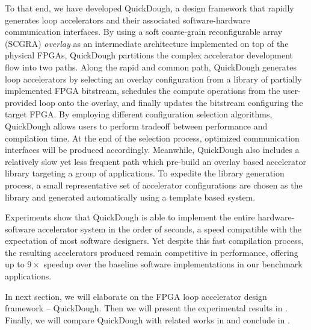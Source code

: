 To that end, we have developed QuickDough, a design framework that rapidly generates loop accelerators and their associated software-hardware communication interfaces. By using a soft coarse-grain reconfigurable array (SCGRA) \emph{overlay} as an intermediate architecture implemented on top of the physical FPGAs, QuickDough partitions the complex accelerator development flow into two paths. Along the rapid and common path, QuickDough generates loop accelerators by selecting an overlay configuration from a library of partially implemented FPGA bitstream, schedules the compute operations from the user-provided loop onto the overlay, and finally updates the bitstream configuring the target FPGA. By employing different configuration selection algorithms, QuickDough allows users to perform tradeoff between performance and compilation time. At the end of the selection process, optimized communication interfaces will be produced accordingly. Meanwhile, QuickDough also includes a relatively slow yet less frequent path which pre-build an overlay based accelerator library targeting a group of applications. To expedite the library generation process, a small representative set of accelerator configurations are chosen as the library and generated automatically using a template based system.


Experiments show that QuickDough is able to implement the entire hardware-software accelerator system in the order of seconds, a speed compatible with the expectation of most software designers. Yet despite this fast compilation process, the resulting accelerators produced remain competitive in performance, offering up to $9\times$ speedup over the baseline software implementations in our benchmark applications.

In next section, we will elaborate on the FPGA loop accelerator design framework -- QuickDough. Then we will present the experimental results in . Finally, we will compare QuickDough with related works in  and conclude in .



